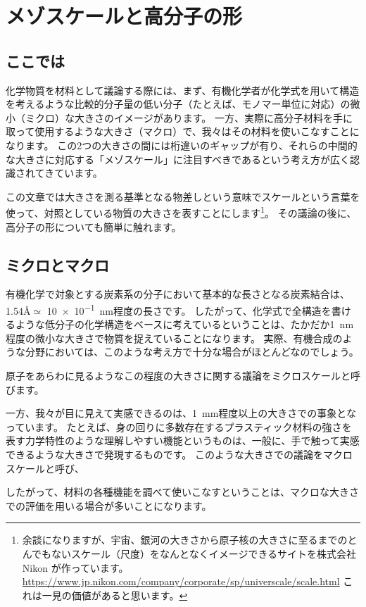 \documentclass[a4paper,11pt]{jlreq}
\begin{document}
\section{メゾスケールと高分子の形}
\subsection{ここでは}
化学物質を材料として議論する際には、まず、有機化学者が化学式を用いて構造を考えるような比較的分子量の低い分子（たとえば、モノマー単位に対応）の微小（ミクロ）な大きさのイメージがあります。
一方、実際に高分子材料を手に取って使用するような大きさ（マクロ）で、我々はその材料を使いこなすことになります。
この2つの大きさの間には桁違いのギャップが有り、それらの中間的な大きさに対応する「メゾスケール」に注目すべきであるという考え方が広く認識されてきています。

この文章では大きさを測る基準となる物差しという意味でスケールという言葉を使って、対照としている物質の大きさを表すことにします\footnote{余談になりますが、宇宙、銀河の大きさから原子核の大きさに至るまでのとんでもないスケール（尺度）をなんとなくイメージできるサイトを株式会社 Nikon が作っています。
	\url{https://www.jp.nikon.com/company/corporate/sp/universcale/scale.html}
	これは一見の価値があると思います。
}。
その議論の後に、高分子の形についても簡単に触れます。

\subsection{ミクロとマクロ}

有機化学で対象とする炭素系の分子において基本的な長さとなる炭素結合は、1.54\AA $\simeq$ \qty{10e-1}{\nano\meter}程度の長さです。
したがって、化学式で全構造を書けるような低分子の化学構造をベースに考えているということは、たかだか\qty{1}{nm}程度の微小な大きさで物質を捉えていることになります。
実際、有機合成のような分野においては、このような考え方で十分な場合がほとんどなのでしょう。

原子をあらわに見るようなこの程度の大きさに関する議論をミクロスケールと呼びます。

一方、我々が目に見えて実感できるのは、\qty{1}{\mm}程度以上の大きさでの事象となっています。
たとえば、身の回りに多数存在するプラスティック材料の強さを表す力学特性のような理解しやすい機能というものは、一般に、手で触って実感できるような大きさで発現するものです。
このような大きさでの議論をマクロスケールと呼び、

したがって、材料の各種機能を調べて使いこなすということは、マクロな大きさでの評価を用いる場合が多いことになります。
\end{document}
